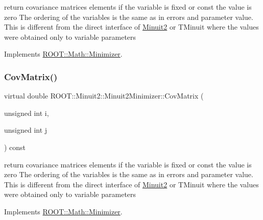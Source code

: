 return covariance matrices elements if the variable is fixed or const the value is zero The ordering of the variables is the same as in errors and parameter value. This is different from the direct interface of \mbox{\hyperlink{namespaceROOT_1_1Minuit2}{Minuit2}} or T\+Minuit where the values were obtained only to variable parameters 

Implements \mbox{\hyperlink{classROOT_1_1Math_1_1Minimizer_a01b0ec371972dab12ca3b9c962d952f8}{R\+O\+O\+T\+::\+Math\+::\+Minimizer}}.

\mbox{\label{classROOT_1_1Minuit2_1_1Minuit2Minimizer_a6ba10de01ab6e7228fa4908894de5619}} 
\subsubsection{\texorpdfstring{CovMatrix()}{CovMatrix()}\hspace{0.1cm}{\footnotesize\ttfamily [2/2]}}
{\footnotesize\ttfamily virtual double R\+O\+O\+T\+::\+Minuit2\+::\+Minuit2\+Minimizer\+::\+Cov\+Matrix (\begin{DoxyParamCaption}\item[{unsigned int}]{i,  }\item[{unsigned int}]{j }\end{DoxyParamCaption}) const\hspace{0.3cm}{\ttfamily [virtual]}}

return covariance matrices elements if the variable is fixed or const the value is zero The ordering of the variables is the same as in errors and parameter value. This is different from the direct interface of \mbox{\hyperlink{namespaceROOT_1_1Minuit2}{Minuit2}} or T\+Minuit where the values were obtained only to variable parameters 

Implements \mbox{\hyperlink{classROOT_1_1Math_1_1Minimizer_a01b0ec371972dab12ca3b9c962d952f8}{R\+O\+O\+T\+::\+Math\+::\+Minimizer}}.

\mbox{\label{classROOT_1_1Minuit2_1_1Minuit2Minimizer_ad9f4873b9651626d2b83cf7eab826b0f}} 
